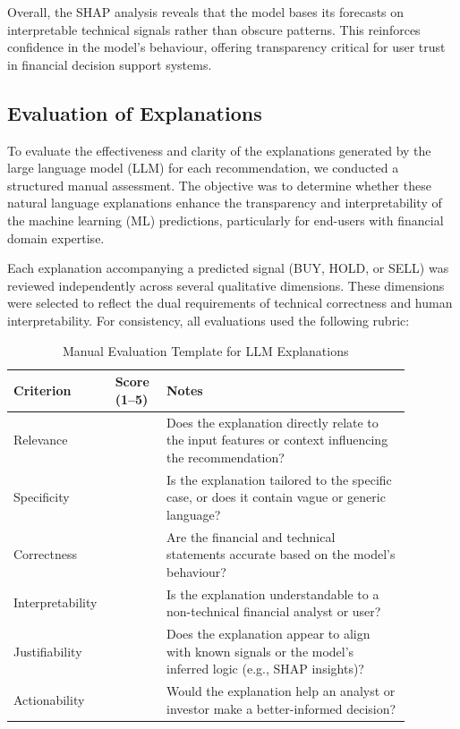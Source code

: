 Overall, the SHAP analysis reveals that the model bases its forecasts on interpretable technical signals rather than obscure patterns. This reinforces confidence in the model's behaviour, offering transparency critical for user trust in financial decision support systems.

\subsection{Evaluation of Explanations}

To evaluate the effectiveness and clarity of the explanations generated by the large language model (LLM) for each recommendation, we conducted a structured manual assessment. The objective was to determine whether these natural language explanations enhance the transparency and interpretability of the machine learning (ML) predictions, particularly for end-users with financial domain expertise.

Each explanation accompanying a predicted signal (BUY, HOLD, or SELL) was reviewed independently across several qualitative dimensions. These dimensions were selected to reflect the dual requirements of technical correctness and human interpretability. For consistency, all evaluations used the following rubric:

\begin{table}[h]
  \centering
  \caption{Manual Evaluation Template for LLM Explanations}
  \label{tab:llm_eval_template}
  \begin{tabular}{|p{0.18\linewidth}|p{0.12\linewidth}|p{0.58\linewidth}|}
    \hline
    \textbf{Criterion} & \textbf{Score (1–5)} & \textbf{Notes} \\
    \hline
    Relevance &  & Does the explanation directly relate to the input features or context influencing the recommendation? \\
    \hline
    Specificity &  & Is the explanation tailored to the specific case, or does it contain vague or generic language? \\
    \hline
    Correctness &  & Are the financial and technical statements accurate based on the model's behaviour? \\
    \hline
    Interpretability &  & Is the explanation understandable to a non-technical financial analyst or user? \\
    \hline
    Justifiability &  & Does the explanation appear to align with known signals or the model’s inferred logic (e.g., SHAP insights)? \\
    \hline
    Actionability &  & Would the explanation help an analyst or investor make a better-informed decision? \\
    \hline
  \end{tabular}
\end{table}

